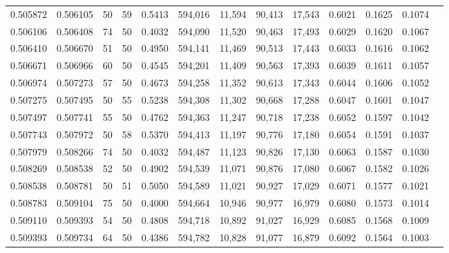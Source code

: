 \begin{tabular}{rrrrrrrrrrrrr}
0.505872 & 0.506105 &    50 &  59 &                                     0.5413 & 594,016 &  11,594 &  90,413 &  17,543 & 0.6021 & 0.1625 & 0.1074 \\
0.506106 & 0.506408 &    74 &  50 &                                     0.4032 & 594,090 &  11,520 &  90,463 &  17,493 & 0.6029 & 0.1620 & 0.1067 \\
0.506410 & 0.506670 &    51 &  50 &                                     0.4950 & 594,141 &  11,469 &  90,513 &  17,443 & 0.6033 & 0.1616 & 0.1062 \\
0.506671 & 0.506966 &    60 &  50 &                                     0.4545 & 594,201 &  11,409 &  90,563 &  17,393 & 0.6039 & 0.1611 & 0.1057 \\
0.506974 & 0.507273 &    57 &  50 &                                     0.4673 & 594,258 &  11,352 &  90,613 &  17,343 & 0.6044 & 0.1606 & 0.1052 \\
0.507275 & 0.507495 &    50 &  55 &                                     0.5238 & 594,308 &  11,302 &  90,668 &  17,288 & 0.6047 & 0.1601 & 0.1047 \\
0.507497 & 0.507741 &    55 &  50 &                                     0.4762 & 594,363 &  11,247 &  90,718 &  17,238 & 0.6052 & 0.1597 & 0.1042 \\
0.507743 & 0.507972 &    50 &  58 &                                     0.5370 & 594,413 &  11,197 &  90,776 &  17,180 & 0.6054 & 0.1591 & 0.1037 \\
0.507979 & 0.508266 &    74 &  50 &                                     0.4032 & 594,487 &  11,123 &  90,826 &  17,130 & 0.6063 & 0.1587 & 0.1030 \\
0.508269 & 0.508538 &    52 &  50 &                                     0.4902 & 594,539 &  11,071 &  90,876 &  17,080 & 0.6067 & 0.1582 & 0.1026 \\
0.508538 & 0.508781 &    50 &  51 &                                     0.5050 & 594,589 &  11,021 &  90,927 &  17,029 & 0.6071 & 0.1577 & 0.1021 \\
0.508783 & 0.509104 &    75 &  50 &                                     0.4000 & 594,664 &  10,946 &  90,977 &  16,979 & 0.6080 & 0.1573 & 0.1014 \\
0.509110 & 0.509393 &    54 &  50 &                                     0.4808 & 594,718 &  10,892 &  91,027 &  16,929 & 0.6085 & 0.1568 & 0.1009 \\
0.509393 & 0.509734 &    64 &  50 &                                     0.4386 & 594,782 &  10,828 &  91,077 &  16,879 & 0.6092 & 0.1564 & 0.1003 \\

\end{tabular}
